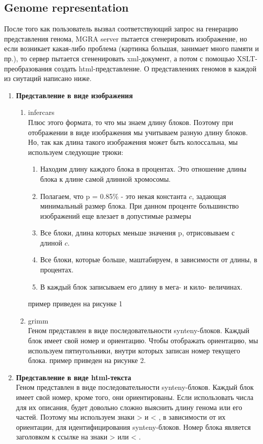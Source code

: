 \documentclass{article}
\begin{document}
\subsection{Genome representation}
После того как пользователь вызвал соответствующий запрос на генерацию представления генома, MGRA server пытается сгенерировать изображение, но если возникает какая-либо проблема (картинка большая, занимает много памяти и пр.), то сервер пытается сгененировать xml-документ, а потом с помощью XSLT-преобразования создать html-представление. О представлениях геномов в каждой из сиутаций написано ниже.  
\begin{enumerate}
	\item \textbf{Представление в виде изображения}
		\begin{enumerate}
			\item infercars \\
			Плюс этого формата, то что мы знаем длину блоков. Поэтому при отображении в виде изображения мы учитываем разную длину блоков. Но, так как длина такого изображения может быть колоссальна, мы используем следующие трюки:   
			\begin{enumerate}
				\item Находим длину каждого блока в процентах. Это отношение длины блока к длине самой длинной хромосомы.
				\item Полагаем, что p = 0.85\% - это некая константа $c$, задающая минимальный размер блока. При данном проценте большинство изображений еще влезает в допустимые размеры
				\item Все блоки, длина которых меньше значения p, отрисовываем с длиной $c$.
				\item Все блоки, которые больше, маштабируем, в зависимости от длины, в процентах.		
				\item В каждый блок записываем его длину в мега- и кило- величинах. 
			\end{enumerate}
			пример приведен на рисунке 1
			\item grimm \\
			Геном представлен в виде последовательности synteny-блоков. Каждый блок имеет свой номер и ориентацию. Чтобы отображать ориентацию, мы используем пятиугольники, внутри которых записан номер текущего блока.
			пример приведен на рисунке 2.
		\end{enumerate}		
	\item \textbf{Представление в виде html-текста} \\
		Геном представлен в виде последовательности synteny-блоков. Каждый блок имеет свой номер, кроме того, они ориентированы. Если использовать числа для их описания, будет довольно сложно выяснить длину генома или его частей. Поэтому мы используем знаки > и < , в зависимости от их ориентации, для идентифицирования synteny-блоков. Номер блока является заголовком к ссылке на знаки > или < . 	
\end{enumerate}
\end{document}
